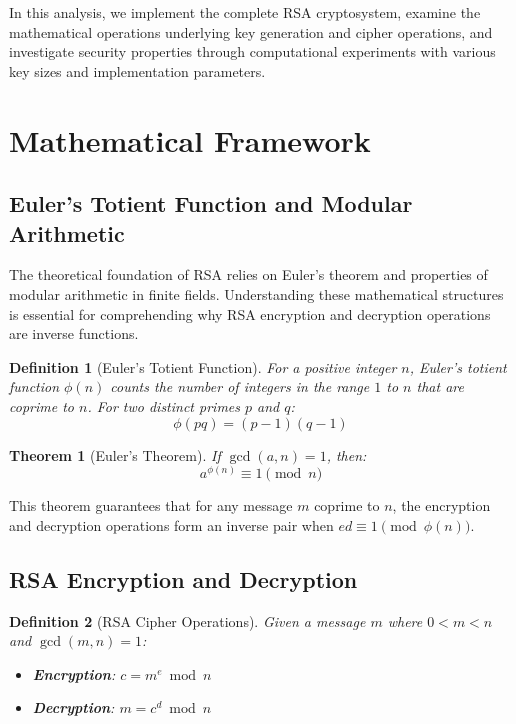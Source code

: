 \documentclass[a4paper, 11pt]{article}
\newtheorem{definition}{Definition}[section]
\newtheorem{theorem}{Theorem}[section]
\begin{document}
In this analysis, we implement the complete RSA cryptosystem, examine the mathematical
operations underlying key generation and cipher operations, and investigate security
properties through computational experiments with various key sizes and implementation
parameters.

\section{Mathematical Framework}

\subsection{Euler's Totient Function and Modular Arithmetic}

The theoretical foundation of RSA relies on Euler's theorem and properties of modular
arithmetic in finite fields. Understanding these mathematical structures is essential for
comprehending why RSA encryption and decryption operations are inverse functions.

\begin{definition}[Euler's Totient Function]
For a positive integer $n$, Euler's totient function $\phi(n)$ counts the number of integers
in the range $1$ to $n$ that are coprime to $n$. For two distinct primes $p$ and $q$:
\begin{equation}
\phi(pq) = (p-1)(q-1)
\end{equation}
\end{definition}

\begin{theorem}[Euler's Theorem]
If $\gcd(a, n) = 1$, then:
\begin{equation}
a^{\phi(n)} \equiv 1 \pmod{n}
\end{equation}
\end{theorem}

This theorem guarantees that for any message $m$ coprime to $n$, the encryption and
decryption operations form an inverse pair when $ed \equiv 1 \pmod{\phi(n)}$.

\subsection{RSA Encryption and Decryption}

\begin{definition}[RSA Cipher Operations]
Given a message $m$ where $0 < m < n$ and $\gcd(m, n) = 1$:
\begin{itemize}
\item \textbf{Encryption}: $c = m^e \bmod n$
\item \textbf{Decryption}: $m = c^d \bmod n$
\end{itemize}
\end{definition}
\end{document}
